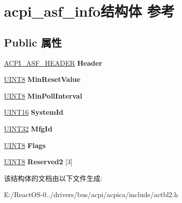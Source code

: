 \hypertarget{structacpi__asf__info}{}\section{acpi\+\_\+asf\+\_\+info结构体 参考}
\label{structacpi__asf__info}
\subsection*{Public 属性}
\begin{DoxyCompactItemize}
\item 
\mbox{\label{structacpi__asf__info_a06a562b7782d4735df0ac0d60c93a456}} 
\hyperlink{structacpi__asf__header}{A\+C\+P\+I\+\_\+\+A\+S\+F\+\_\+\+H\+E\+A\+D\+ER} {\bfseries Header}
\item 
\mbox{\label{structacpi__asf__info_a069c8b7e4bc878166ada5a25c4ab441e}} 
\hyperlink{_processor_bind_8h_ab27e9918b538ce9d8ca692479b375b6a}{U\+I\+N\+T8} {\bfseries Min\+Reset\+Value}
\item 
\mbox{\label{structacpi__asf__info_ad0b8a56cd7b3be36b44f48774a3c1946}} 
\hyperlink{_processor_bind_8h_ab27e9918b538ce9d8ca692479b375b6a}{U\+I\+N\+T8} {\bfseries Min\+Poll\+Interval}
\item 
\mbox{\label{structacpi__asf__info_aa4d73b0ec86ba1489382c4b8672438b0}} 
\hyperlink{_processor_bind_8h_a09f1a1fb2293e33483cc8d44aefb1eb1}{U\+I\+N\+T16} {\bfseries System\+Id}
\item 
\mbox{\label{structacpi__asf__info_a98185d26c8b16469ffba410d5c75fee0}} 
\hyperlink{_processor_bind_8h_ae1e6edbbc26d6fbc71a90190d0266018}{U\+I\+N\+T32} {\bfseries Mfg\+Id}
\item 
\mbox{\label{structacpi__asf__info_a1474db0ee6fd2db043628a47178e3544}} 
\hyperlink{_processor_bind_8h_ab27e9918b538ce9d8ca692479b375b6a}{U\+I\+N\+T8} {\bfseries Flags}
\item 
\mbox{\label{structacpi__asf__info_a9c1d45933dfda779d9d7c412fdc2c7b4}} 
\hyperlink{_processor_bind_8h_ab27e9918b538ce9d8ca692479b375b6a}{U\+I\+N\+T8} {\bfseries Reserved2} \mbox{[}3\mbox{]}
\end{DoxyCompactItemize}


该结构体的文档由以下文件生成\+:\begin{DoxyCompactItemize}
\item 
E\+:/\+React\+O\+S-\/0../drivers/bus/acpi/acpica/include/actbl2.\+h\end{DoxyCompactItemize}

